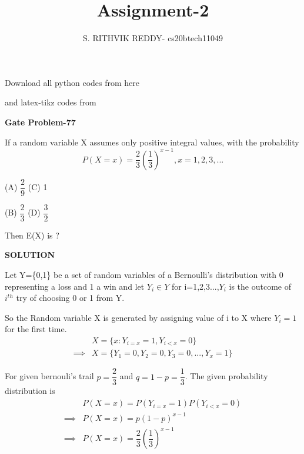 \documentclass[a4paper]{article}
\title{Assignment-2}
\author{S. RITHVIK REDDY- cs20btech11049}
\date{}
\begin{document}
\maketitle
\noindent
Download all python codes from here

\begin{multicols*}{2}
\noindent
{}
    
\vspace{0.3cm}
and latex-tikz codes from  

\vspace{0.3cm}  
    
   
\vspace{0.5cm}
\textbf{Gate Problem-77}
\vspace{0.5cm}

If a random variable X assumes only positive integral values, with the probability 
$$P(X=x)=\dfrac{2}{3}\left(\dfrac{1}{3}\right)^{x-1} , x=1,2,3,...$$

(A) $\dfrac{2}{9}$ \hspace{2 cm} (C) 1

\vspace{0.5 cm}
(B) $\dfrac{2}{3}$ \hspace{2 cm} (D) $\dfrac{3}{2}$

Then E(X) is ?

\vspace{0.5cm}
\textbf{SOLUTION}
\vspace{0.5cm}

Let Y=\{0,1\} be a set of random variables of a Bernoulli's distribution with 0 representing a loss and 1 a win and let $Y_i \in Y$ for i=1,2,3...,$Y_i$ is the outcome of $i^{th}$ try of choosing 0 or 1 from Y.

 So the Random variable X is generated by assigning value of i to X where $Y_i=1$ for the first time.
\begin{align*}
&X=\{x:Y_{i=x}=1,Y_{i<x}=0\} \\
\implies & X=\{Y_1=0,Y_2=0,Y_3=0,...,Y_x=1\}
\end{align*}


For given bernouli's trail $p=\dfrac{2}{3}$ and $q=1-p=\dfrac{1}{3}$. The given probability distribution is 
\begin{align*}
&P(X=x)=P(Y_{i=x}=1)P(Y_{i<x}=0)\\
\implies &P(X=x)=p(1-p)^{x-1}\\
\implies &P(X=x)=\dfrac{2}{3}\left(\dfrac{1}{3}\right)^{x-1}
\end{align*}


\end{multicols*}
\end{document}
